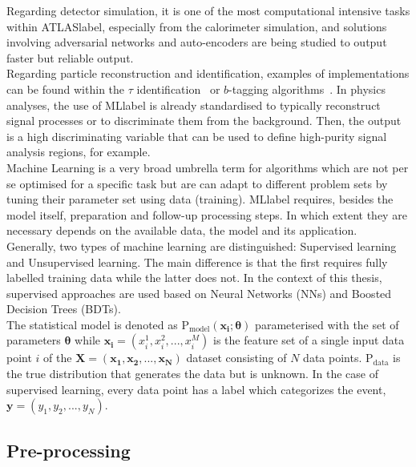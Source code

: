 Regarding detector simulation, it is one of the most computational intensive tasks within \acrshort{ATLASlabel}, especially from the calorimeter simulation, and solutions involving adversarial networks and auto-encoders are being studied to output faster but reliable output.\\

Regarding particle reconstruction and identification, examples of implementations can be found within the $\tau$ identification~\cite{ATLAS:2019uhp} or $b$-tagging algorithms~\cite{ATL-PHYS-PUB-2020-014}. In physics analyses, the use of \acrshort{MLlabel} is already standardised to typically reconstruct signal processes or to discriminate them from the background. Then, the output is a high discriminating variable that can be used to define high-purity signal analysis regions, for example.\\

Machine Learning is a very broad umbrella term for algorithms which are not per se optimised for a specific task but are can adapt to different problem sets by tuning their parameter set using data (training).
\acrshort{MLlabel} requires, besides the model itself, preparation and follow-up processing steps. In which extent they are necessary depends on the available data, the model and its application.\\

Generally, two types of machine learning are distinguished: Supervised learning and Unsupervised learning. The main difference is that the first requires fully labelled training data while the latter does not. In the context of this thesis, supervised approaches are used based on Neural Networks (NNs) and Boosted Decision Trees (BDTs).\\

The statistical model is denoted as $\text{P}_\text{model}(\mathbf{x_i}; \boldsymbol{\theta})$ parameterised with the set of parameters $\boldsymbol{\theta}$ while $\mathbf{x_i}=(x_i^1,x_i^2,...,x_i^M)$ is the feature set of a single input data point $i$ of the $\mathbf{X}=(\mathbf{x_1},\mathbf{x_2},...,\mathbf{x_N})$ dataset consisting of $N$ data points. $\text{P}_\text{data}$ is the true distribution that generates the data but is unknown. In the case of supervised learning, every data point has a label which categorizes the event, $\mathbf{y}=(y_1,y_2,...,y_N)$.

\subsection{Pre-processing}

